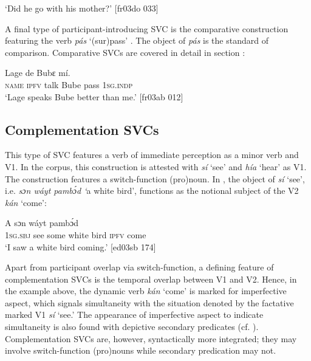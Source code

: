 \glt ‘Did he go with his mother?’ [fr03do 033]
\z

A final type of participant-introducing SVC is the comparative construction featuring the verb \textit{pás} ‘(sur)pass’ . The object of \textit{pás} is the standard of comparison. Comparative SVCs are covered in detail in section :


\ea%
    \label{ex:key:1576}
    \gll Lage    de      Bubɛ      mí.\\
\textsc{name}  \textsc{ipfv}  talk    Bube  pass    \textsc{1sg.indp}\\

\glt ‘Lage speaks Bube better than me.’ [fr03ab 012]
\z

\subsection{Complementation SVCs}

This type of SVC features a verb of immediate perception as a minor verb and V1. In the corpus, this construction is attested with \textit{sí} ‘see’ and \textit{hía} ‘hear’ as V1. The construction features a switch-function (pro)noun. In , the object of \textit{sí} ‘see’, i.e. \textit{sɔn wáyt pambɔ́d ‘}a white bird’, functions as the notional subject of the V2 \textit{kán} ‘come’: 


\ea%
    \label{ex:key:1577}
    \gll \MakeUppercase{A}     sɔn    wáyt  pambɔ́d    \\
\textsc{1sg.sbj}  see  some  white  bird    \textsc{ipfv}  come\\

\glt ‘I saw a white bird coming.’ [ed03sb 174]
\z

Apart from participant overlap via switch-function, a defining feature of complementation SVCs is the temporal overlap between V1 and V2. Hence, in the example above, the dynamic verb \textit{kán} ‘come’ is marked for imperfective aspect, which signals simultaneity with the situation denoted by the factative marked V1 \textit{sí} ‘see.’ The appearance of imperfective aspect to indicate simultaneity is also found with depictive secondary predicates (cf. ). Complementation SVCs are, however, syntactically more integrated; they may involve switch-function (pro)nouns while secondary predication may not.


